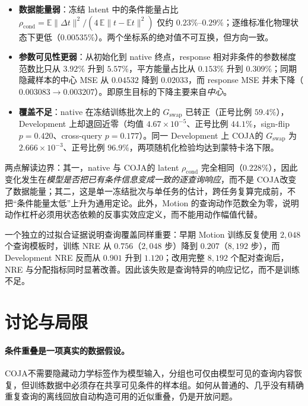 \documentclass[UTF8,zihao=-4,fontset=fandol]{ctexart}
\newcommand{\method}{\textsc{COJA}}
\begin{document}
\begin{itemize}
  \item \textbf{数据能量弱}：冻结 latent 中的条件能量占比 $\rho_{\mathrm{cond}}=\mathbb{E}\lVert\Delta t\rVert^2/(4\,\mathbb{E}\lVert t-\mathbb{E}t\rVert^2)$ 仅约 $0.23\%$--$0.29\%$；逐维标准化物理状态下更低（$0.00535\%$）。两个坐标系的绝对值不可互换，但方向一致。
  \item \textbf{参数可见性更弱}：从初始化到 native 终点，response 相对非条件的参数梯度范数比只从 $3.92\%$ 升到 $5.57\%$，平方能量占比从 $0.153\%$ 升到 $0.309\%$；同期隐藏样本的中心 MSE 从 $0.04532$ 降到 $0.02033$，而 response MSE 并未下降（$0.003083\rightarrow0.003207$）。即原生目标的下降主要来自\emph{中心}。
  \item \textbf{覆盖不足}：native 在冻结训练批次上的 $G_{\mathrm{swap}}$ 已转正（正号比例 $59.4\%$），Development 上却退回近零（均值 $4.67\times10^{-5}$、正号比例 $44.1\%$，sign-flip $p=0.420$、cross-query $p=0.177$）。同一 Development 上 \method 的 $G_{\mathrm{swap}}$ 为 $2.666\times10^{-3}$、正号比例 $96.9\%$，两项随机化检验均达到蒙特卡洛下限。
\end{itemize}

两点解读边界：其一，native 与 \method 的 latent $\rho_{\mathrm{cond}}$ 完全相同（$0.228\%$），因此变化发生在\emph{模型是否把已有条件信息变成一致的逐查询响应}，而不是 \method 改变了数据能量；其二，这是单一冻结批次与单任务的估计，跨任务复算完成前，不把“条件能量太低”上升为通用定论。此外，Motion 的查询动作范数全为零，说明动作杠杆必须用状态依赖的反事实效应定义，而不能用动作幅值代替。

一个独立的过拟合证据说明查询覆盖同样重要：早期 Motion 训练反复使用 $2{,}048$ 个查询模板时，训练 NRE 从 $0.756$（$2{,}048$ 步）降到 $0.207$（$8{,}192$ 步），而 Development NRE 反而从 $0.901$ 升到 $1.120$；改用完整 $8{,}192$ 个配对查询后，NRE 与分配指标同时显著改善。因此该失败是查询特异的响应记忆，而不是训练不足。

\section{讨论与局限}

\paragraph{条件重叠是一项真实的数据假设。}
\method 不需要隐藏动力学标签作为模型输入，分组也可仅由模型可见的查询内容恢复，但训练数据中必须存在共享可见条件的样本组。如何从普通的、几乎没有精确重复查询的离线回放自动构造可用的近似重叠，仍是开放问题。
\end{document}
